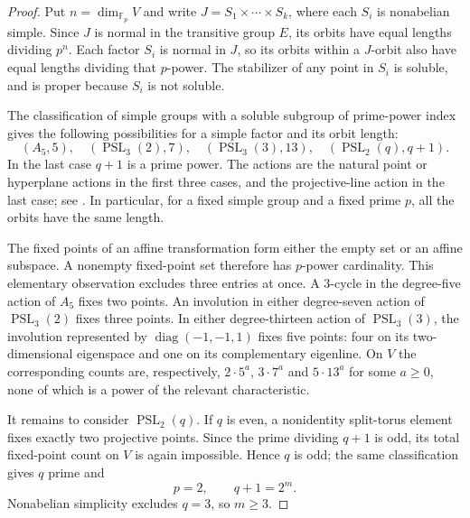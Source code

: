 \documentclass[11pt,a4paper]{amsart}
\theoremstyle{remark}
\numberwithin{equation}{section}
\begin{document}
\begin{proof}
Put $n=\dim_{\mathbb F_p}V$ and write
$J=S_1\times\cdots\times S_k$, where each $S_i$ is nonabelian simple.
Since $J$ is normal in the transitive group $E$, its orbits have equal
lengths dividing $p^n$. Each factor $S_i$ is normal in $J$, so its
orbits within a $J$-orbit also have equal lengths dividing that $p$-power. The stabilizer of any point in $S_i$ is soluble,
and is proper because $S_i$ is not soluble.

The classification of simple groups with a soluble subgroup of prime-power
index gives the following possibilities for a simple factor and its orbit
length:
\[
 (A_5,5),\quad
 (\operatorname{PSL}_3(2),7),\quad
 (\operatorname{PSL}_3(3),13),\quad
 (\operatorname{PSL}_2(q),q+1).
\]
In the last case $q+1$ is a prime power. The actions are the natural
point or hyperplane actions in the first three cases, and the projective-line
action in the last case; see \cite[Lemma~6 and Corollary~7]{BastosSchneider}.
In particular, for a fixed simple group and a fixed prime $p$, all the
orbits have the same length.

The fixed points of an affine transformation form either the empty set
or an affine subspace. A nonempty fixed-point set therefore has $p$-power
cardinality. This elementary observation excludes three entries at once.
A $3$-cycle in the degree-five action of $A_5$ fixes two points. An
involution in either degree-seven action of $\operatorname{PSL}_3(2)$
fixes three points. In either degree-thirteen action of
$\operatorname{PSL}_3(3)$, the involution represented by
$\operatorname{diag}(-1,-1,1)$ fixes five points: four on its two-dimensional
eigenspace and one on its complementary eigenline. On $V$ the corresponding
counts are, respectively, $2\cdot5^a$, $3\cdot7^a$ and $5\cdot13^a$
for some $a\geq0$, none of which is a power of the relevant characteristic.

It remains to consider $\operatorname{PSL}_2(q)$. If $q$ is even, a
nonidentity split-torus element fixes exactly two projective points.
Since the prime dividing $q+1$ is odd, its total fixed-point count on
$V$ is again impossible. Hence $q$ is odd; the same classification gives $q$ prime and
\[
 p=2,\qquad q+1=2^m.
\]
Nonabelian simplicity excludes $q=3$, so $m\geq3$.


\end{proof}
\end{document}
